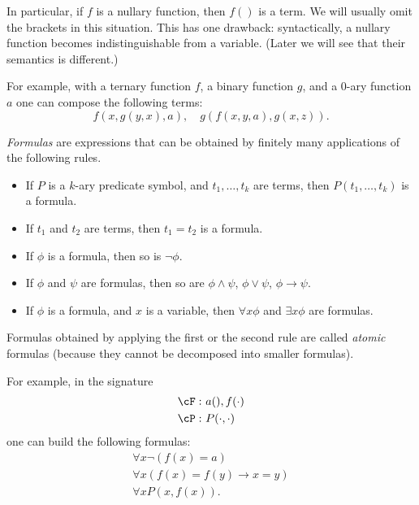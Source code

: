 \begin{page}
\setcounter{section}{1}
\setcounter{subsection}{1}
\setcounter{dfn}{2}
\label{portion:562}

In particular, if $f$ is a nullary function, then $f()$ is a term.
We will usually omit the brackets in this situation.
This has one drawback: syntactically, a nullary function becomes indistinguishable from a variable.
(Later we will see that their semantics is different.)

For example, with a ternary function $f$, a binary function $g$, and a $0$-ary function $a$ one can compose the following terms:
\[
f(x, g(y,x), a), \quad g(f(x,y,a), g(x,z)).
\]


\end{page}

\begin{page}
\setcounter{section}{1}
\setcounter{subsection}{1}
\setcounter{dfn}{3}
\label{portion:564}

\begin{dfn}
\emph{Formulas} are expressions that can be obtained by finitely many applications of the following rules.
\begin{itemize}
\item
If $P$ is a $k$-ary predicate symbol, and $t_1, \ldots, t_k$ are terms, then $P(t_1, \ldots, t_k)$ is a formula.
\item
If $t_1$ and $t_2$ are terms, then $t_1 = t_2$ is a formula.
\item
If $\phi$ is a formula, then so is $\neg \phi$.
\item
If $\phi$ and $\psi$ are formulas, then so are $\phi \wedge \psi$, $\phi \vee \psi$, $\phi \to \psi$.
\item
If $\phi$ is a formula, and $x$ is a variable, then $\forall x \phi$ and $\exists x \phi$ are formulas.
\end{itemize}
\end{dfn}

\end{page}

\begin{page}
\setcounter{section}{1}
\setcounter{subsection}{1}
\setcounter{dfn}{3}
\label{portion:565}

Formulas obtained by applying the first or the second rule are called \emph{atomic} formulas (because they cannot be decomposed into smaller formulas).

For example, in the signature
\begin{align*}
\cF:\ &a(), f(\cdot) \\
\cP:\ &P(\cdot, \cdot)
\end{align*}
one can build the following formulas:
\begin{gather*}
\forall x \neg(f(x) = a)\\
\forall x (f(x)=f(y) \to x=y)\\
\forall x P(x, f(x)).
\end{gather*}



\end{page}

